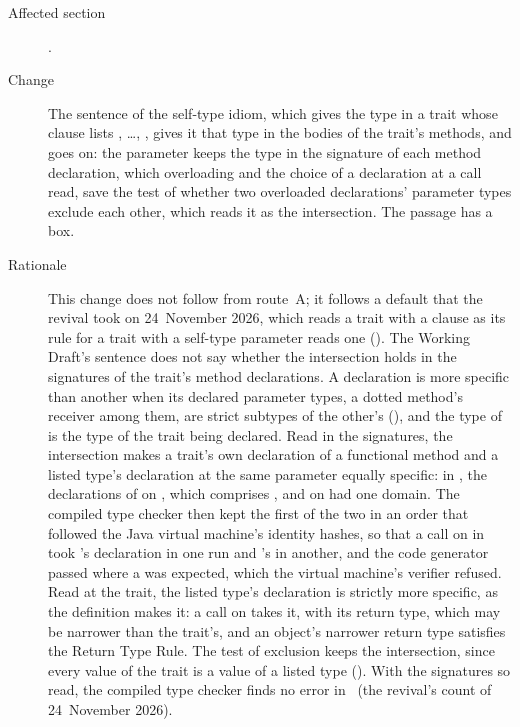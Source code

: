 \begin{description}
\item[Affected section] .
\item[Change] The sentence of the self-type idiom, which gives  the
type  in a trait  whose
 clause lists , \ldots, , gives it that type in
the bodies of the trait's methods, and goes on: the  parameter keeps
the type  in the signature of each method declaration, which overloading
and the choice of a declaration at a call read, save the test of whether two
overloaded declarations' parameter types exclude each other, which reads it as
the intersection.
The passage has a box.
\item[Rationale] This change does not follow from route~A; it follows a default
that the revival took on 24~November 2026, which reads a trait with a
 clause as its rule for a trait with a self-type parameter reads
one ().
The Working Draft's sentence does not say whether the intersection holds in the
signatures of the trait's method declarations.
A declaration is more specific than another when its declared parameter types,
a dotted method's receiver among them, are strict subtypes of the other's
(), and the type of  is the type of the
trait being declared.
Read in the signatures, the intersection makes a trait's own declaration of a
functional method and a listed type's declaration at the same parameter
equally specific: in \library, the declarations of  on
, which comprises , and on  had one domain.
The compiled type checker then kept the first of the two in an order that
followed the Java virtual machine's identity hashes, so that a call on
 in  took 's declaration in one run and 's
in another, and the code generator passed  where a  was
expected, which the virtual machine's verifier refused.
Read at the trait, the listed type's declaration is strictly more specific, as
the definition makes it: a call on  takes it, with its return type,
which may be narrower than the trait's, and an object's narrower return type
satisfies the Return Type Rule.
The test of exclusion keeps the intersection, since every value of the trait is
a value of a listed type ().
With the signatures so read, the compiled type checker finds no error in
\library\ (the revival's count of 24~November 2026).

\end{description}
